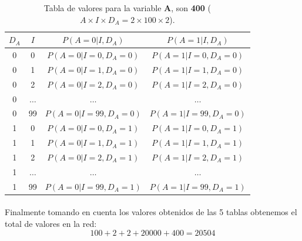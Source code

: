 \documentclass[12pt]{article}
\begin{document}
\begin{table}[h!]
	\centering
	\begin{tabular}{|c|c|c|c|}
		\hline
		\rowcolor[gray]{.8}
		$D_A$&$I$&$P(A=0|I,D_A)$&$P(A=1|I,D_A)$ \\\hline %
		0 & 0 & $P(A=0|I=0,D_A=0)$ &$P(A=1|I=0,D_A=0)$\\\hline
		0 & 1 & $P(A=0|I=1,D_A=0)$ &$P(A=1|I=1,D_A=0)$\\\hline
		0 & 2 & $P(A=0|I=2,D_A=0)$ &$P(A=1|I=2,D_A=0)$\\\hline
		0 & $\dots$ & $\dots$ &$\dots$\\\hline
		0 & 99 & $P(A=0|I=99,D_A=0)$ &$P(A=1|I=99,D_A=0)$\\\hline
		1 & 0 & $P(A=0|I=0,D_A=1)$ &$P(A=1|I=0,D_A=1)$\\\hline
		1 & 1 & $P(A=0|I=1,D_A=1)$ &$P(A=1|I=1,D_A=1)$\\\hline
		1 & 2 & $P(A=0|I=2,D_A=1)$ &$P(A=1|I=2,D_A=1)$\\\hline
		1 & $\dots$ & $\dots$ &$\dots$\\\hline
		1 & 99 & $P(A=0|I=99,D_A=1)$ &$P(A=1|I=99,D_A=1)$\\\hline
	\end{tabular}
	\caption{Tabla de valores para la variable $\pmb{A}$, son \textbf{400} ($A\times I\times D_A=2\times 100 \times 2$).}
	\label{tab:ej1015}
\end{table}\pagebreak
\paragraph{} Finalmente tomando en cuenta los valores obtenidos de las 5 tablas obtenemos el total de valores en la red:
\begin{equation}
100 + 2 + 2 + 20000 + 400 = 20504
\end{equation}
\pagebreak
\end{document}
